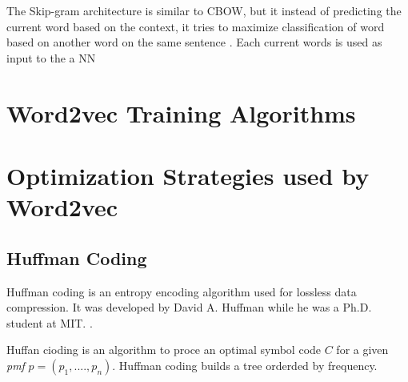 The Skip-gram architecture is similar to \ac{CBOW}, but it instead of
predicting the current word based on the context, it tries to maximize
classification of word based on another word on the same sentence
\cite{DBLP:journals/corr/abs-1301-3781}.  Each current words is used as input
to the  a \ac{NN} 



\section{Word2vec Training Algorithms}
\label{sec:word2v-tran-algorithms}


\section{Optimization Strategies used by Word2vec}
\label{sec:strategies_improve_time}

\subsection{Huffman Coding}
\label{sec:huffman_coding}

Huffman coding is an entropy  encoding algorithm used for lossless data
compression.  It was developed by David A. Huffman while he was a Ph.D.
student at MIT. \cite{huf52}.

Huffan cioding is an algorithm to proce an  optimal symbol code $C$ for a given 
\emph{pmf} $ p = (p_1,....,p_n) $.  Huffman coding builds a tree orderded by frequency.



